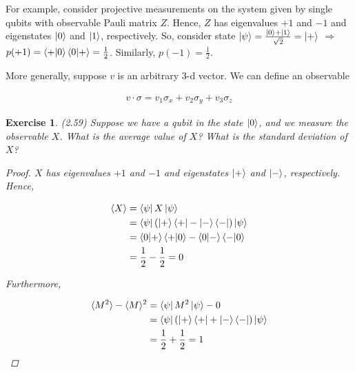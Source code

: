 \documentclass[11pt]{article}
\newcommand\0{\mathbf{0}}
\newcommand\<{\langle}
\renewcommand\>{\rangle}
\renewcommand\implies{\Rightarrow}
\newtheorem{exercise}[theorem]{Exercise}
\begin{document}
For example, consider projective measurements on the system given by single qubits with observable Pauli matrix $Z$. Hence, $Z$ has eigenvalues $+1$ and $-1$ and eigenstates $\ket{0}$ and $\ket{1}$, respectively. So, consider state $\ket{\psi} = \frac{\ket{0} + \ket{1}}{\sqrt{2}}= \ket{+}$ $\implies$ $p(+1) = \bra{+}\ket{0}\bra{0}\ket{+} = \frac{1}{2}$. Similarly, $p(-1) = \frac{1}{2}$. 

More generally, suppose $v$ is an arbitrary 3-d vector. We can define an observable

\begin{align*}
v \cdot \sigma = v_1\sigma_x + v_2 \sigma_y + v_3\sigma_z
\end{align*}

\begin{exercise}
	(2.59) Suppose we have a qubit in the state $\ket{0}$, and we measure the observable $X$. What is the average value of $X$? What is the standard deviation of $X$?
	
	\begin{proof}
		$X$ has eigenvalues $+1$ and $-1$ and eigenstates $\ket{+}$ and $\ket{-}$, respectively. Hence,
		
	\begin{align*}
	\< X \> &= \bra{\psi} X 	\ket{\psi} \\
	&= \bra{\psi} (\ket{+}\bra{+} - \ket{-}\bra{-}) \ket{\psi} \\
	&= \bra{0}\ket{+}\bra{+}\ket{0} - \bra{0}\ket{-}\bra{-}\ket{0}\\
	&= \frac{1}{2} - \frac{1}{2} = 0
	\end{align*}
	
	Furthermore,

	\begin{align*}
	\< M^2 \> - \< M \>^2 &= \bra{\psi} M^2 	\ket{\psi} - 0 \\
	&= \bra{\psi} (\ket{+}\bra{+} + \ket{-}\bra{-}) \ket{\psi} \\
	&= \frac{1}{2} + \frac{1}{2} = 1
	\end{align*}
	\end{proof}
	
\end{exercise}
\end{document}
